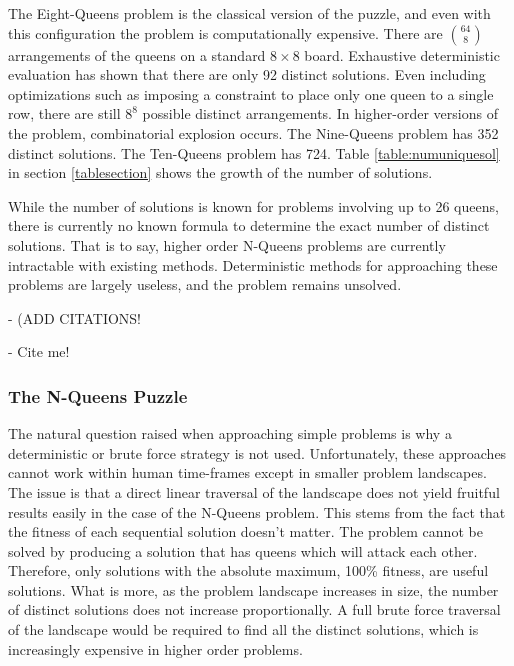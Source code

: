 \documentclass{sig-alternate}
\begin{document}
The Eight-Queens problem is the classical version of the puzzle, and even with this configuration the problem is computationally expensive. There are {$64 \choose 8$} arrangements of the queens on a standard {$8\times{}8$} board. Exhaustive deterministic evaluation has shown that there are only 92 distinct solutions. Even including optimizations such as imposing a constraint to place only one queen to a single row, there are still {$8^8$} possible distinct arrangements. In higher-order versions of the problem, combinatorial explosion occurs. The Nine-Queens problem has 352 distinct solutions. The Ten-Queens problem has 724. Table \ref{table:numuniquesol} in section \ref{tablesection} shows the growth of the number of solutions. 

While the number of solutions is known for problems involving up to 26 queens, there is currently no known formula to determine the exact number of distinct solutions. That is to say, higher order N-Queens problems are currently intractable with existing methods. Deterministic methods for approaching these problems are largely useless, and the problem remains unsolved.

- (ADD CITATIONS!
  
- Cite me!\cite{crawford1992solving,homaifar1992e1,andrews2006investigation,tuson1998adapting, wolpert1997no,srinivas1994adaptive,goldberg1988genetic}

\subsubsection{The N-Queens Puzzle}
The natural question raised when approaching simple problems is why a deterministic or brute force strategy is not used. Unfortunately, these approaches cannot work within human time-frames except in smaller problem landscapes. The issue is that a direct linear traversal of the landscape does not yield fruitful results easily in the case of the N-Queens problem. This stems from the fact that the fitness of each sequential solution doesn't matter. The problem cannot be solved by producing a solution that has queens which will attack each other. Therefore, only solutions with the absolute maximum, 100\% fitness, are useful solutions. What is more, as the problem landscape increases in size, the number of distinct solutions does not increase proportionally. A full brute force traversal of the landscape would be required to find all the distinct solutions, which is increasingly expensive in higher order problems.
\end{document}
